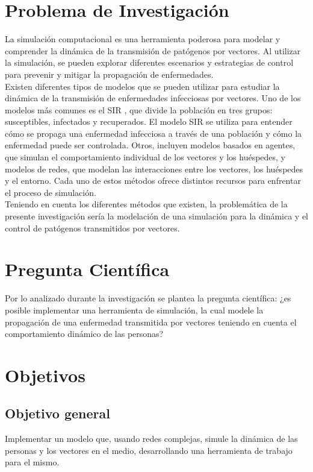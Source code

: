 \section{Problema de Investigación}
La simulación computacional es una herramienta poderosa para modelar y comprender
la dinámica de la transmisión de patógenos por vectores. Al utilizar la simulación,
se pueden explorar diferentes escenarios y estrategias de control para prevenir y mitigar 
la propagación de enfermedades.\autocite{Ferguson2006}\\
Existen diferentes tipos de modelos que se pueden utilizar para estudiar 
la dinámica de la transmisión de enfermedades infecciosas por vectores. Uno
de los modelos más comunes es el SIR 
\autocite{Kermack1927}, que divide la población en tres grupos:
susceptibles, infectados y recuperados. El modelo SIR se utiliza para entender cómo
se propaga una enfermedad infecciosa a través de una población y cómo la enfermedad 
puede ser controlada. Otros, incluyen modelos basados en
agentes, que simulan el comportamiento individual de los vectores y los huéspedes, y
modelos de redes, que modelan las interacciones entre los vectores, los huéspedes y
el entorno. Cada uno de estos métodos ofrece distintos recursos para enfrentar el proceso de simulación.
\autocite{Ferguson2006} \autocite{Balcan2009}\\
Teniendo en cuenta los diferentes métodos que existen, la problemática de la presente
investigación sería la modelación de una simulación para la dinámica y el control de patógenos 
transmitidos por vectores.\\

\section{Pregunta Científica}
Por lo analizado durante la investigación se plantea la pregunta científica: ¿es posible implementar una
herramienta de simulación, la cual modele la propagación de una enfermedad transmitida por vectores 
teniendo en cuenta el comportamiento dinámico
de las personas?


\section{Objetivos}
\subsection{Objetivo general}
Implementar un modelo que, usando redes complejas, simule la dinámica de las personas y los vectores en el medio, 
desarrollando una herramienta de trabajo para el mismo.

